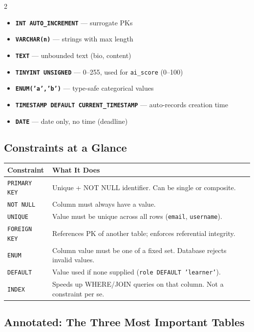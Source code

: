\documentclass[11pt,a4paper]{article}
\newcommand{\kw}[1]{\textbf{\texttt{#1}}}
\newcommand{\T}[1]{\texttt{#1}}          %
\begin{document}
\begin{multicols}{2}
\begin{itemize}[nosep, leftmargin=1.5em]
  \item \kw{INT AUTO\_INCREMENT} — surrogate PKs
  \item \kw{VARCHAR(n)} — strings with max length
  \item \kw{TEXT} — unbounded text (bio, content)
  \item \kw{TINYINT UNSIGNED} — 0–255, used for \T{ai\_score} (0–100)
  \item \kw{ENUM('a','b')} — type-safe categorical values
  \item \kw{TIMESTAMP DEFAULT CURRENT\_TIMESTAMP} — auto-records creation time
  \item \kw{DATE} — date only, no time (deadline)
\end{itemize}
\end{multicols}

\subsection{Constraints at a Glance}

\begin{center}
\renewcommand{\arraystretch}{1.2}
\begin{tabular}{@{}p{2.5cm}p{10cm}@{}}
\toprule
\textbf{Constraint} & \textbf{What It Does} \\
\midrule
\T{PRIMARY KEY}    & Unique + NOT NULL identifier. Can be single or composite. \\
\T{NOT NULL}       & Column must always have a value. \\
\T{UNIQUE}         & Value must be unique across all rows (\T{email}, \T{username}). \\
\T{FOREIGN KEY}    & References PK of another table; enforces referential integrity. \\
\T{ENUM}           & Column value must be one of a fixed set. Database rejects invalid values. \\
\T{DEFAULT}        & Value used if none supplied (\T{role DEFAULT 'learner'}). \\
\T{INDEX}          & Speeds up WHERE/JOIN queries on that column. Not a constraint per se. \\
\bottomrule
\end{tabular}
\end{center}

\subsection{Annotated: The Three Most Important Tables}
\end{document}

